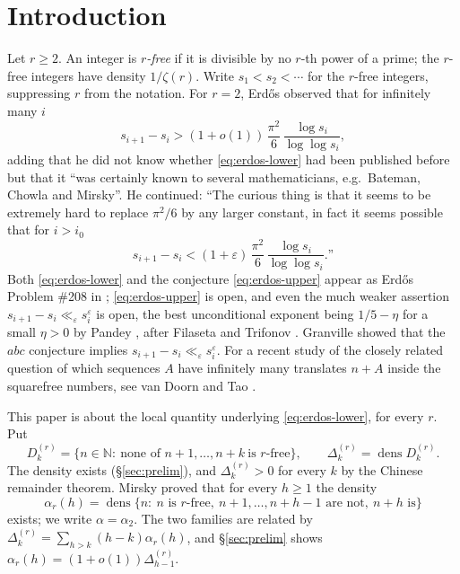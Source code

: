 \documentclass[11pt,reqno]{amsart}
\theoremstyle{plain}
\theoremstyle{definition}
\numberwithin{equation}{section}
\newcommand{\N}{\mathbb{N}}
\DeclareMathOperator{\dens}{dens}
\begin{document}
\maketitle

\section{Introduction}\label{sec:intro}

Let $r\ge2$. An integer is \emph{$r$-free} if it is divisible by no $r$-th power of a
prime; the $r$-free integers have density $1/\zeta(r)$. Write $s_1<s_2<\cdots$ for the
$r$-free integers, suppressing $r$ from the notation. For $r=2$, Erd\H{o}s
\cite[(20)]{Erdos1951} observed that for infinitely many $i$
\begin{equation}\label{eq:erdos-lower}
  s_{i+1}-s_i>(1+o(1))\,\frac{\pi^{2}}{6}\,\frac{\log s_i}{\log\log s_i},
\end{equation}
adding that he did not know whether \eqref{eq:erdos-lower} had been published before but
that it ``was certainly known to several mathematicians, e.g.\ Bateman, Chowla and
Mirsky''. He continued: ``The curious thing is that it seems to be extremely hard to
replace $\pi^{2}/6$ by any larger constant, in fact it seems possible that for $i>i_0$
\begin{equation}\label{eq:erdos-upper}
  s_{i+1}-s_i<(1+\varepsilon)\,\frac{\pi^{2}}{6}\,\frac{\log s_i}{\log\log s_i}.\text{''}
\end{equation}
Both \eqref{eq:erdos-lower} and the conjecture \eqref{eq:erdos-upper} appear as Erd\H{o}s
Problem \#208 in \cite{Bloom}; \eqref{eq:erdos-upper} is open, and even the much weaker
assertion $s_{i+1}-s_i\ll_\varepsilon s_i^{\varepsilon}$ is open, the best unconditional
exponent being $1/5-\eta$ for a small $\eta>0$ by Pandey \cite{Pandey}, after Filaseta and
Trifonov \cite{FT1992}. Granville \cite{Granville} showed that the $abc$ conjecture implies
$s_{i+1}-s_i\ll_\varepsilon s_i^{\varepsilon}$. For a recent study of the closely related
question of which sequences $A$ have infinitely many translates $n+A$ inside the squarefree
numbers, see van Doorn and Tao \cite{VDT}.

This paper is about the local quantity underlying \eqref{eq:erdos-lower}, for every $r$.
Put
\begin{equation}\label{eq:def-D}
  D^{(r)}_k=\{n\in\N:\ \text{none of } n+1,\dots,n+k\ \text{is } r\text{-free}\},\qquad
  \Delta^{(r)}_k=\dens D^{(r)}_k .
\end{equation}
The density exists (\S\ref{sec:prelim}), and $\Delta^{(r)}_k>0$ for every $k$ by the
Chinese remainder theorem. Mirsky \cite[Thm.~4]{Mirsky} proved that for every $h\ge1$ the
density
\begin{equation}\label{eq:def-alpha}
  \alpha_r(h)=\dens\{n:\ n\text{ is }r\text{-free},\ n+1,\dots,n+h-1\text{ are not},\
  n+h\text{ is}\}
\end{equation}
exists; we write $\alpha=\alpha_2$. The two families are related by
$\Delta^{(r)}_k=\sum_{h>k}(h-k)\alpha_r(h)$, and \S\ref{sec:prelim} shows
$\alpha_r(h)=(1+o(1))\Delta^{(r)}_{h-1}$.
\end{document}
